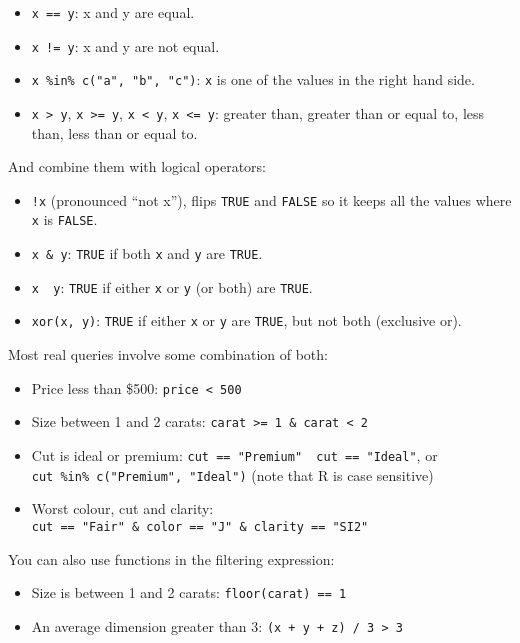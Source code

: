 \begin{itemize}
\tightlist
\item
  \texttt{x\ ==\ y}: x and y are equal.
\item
  \texttt{x\ !=\ y}: x and y are not equal.
\item
  \texttt{x\ \%in\%\ c("a",\ "b",\ "c")}: \texttt{x} is one of the
  values in the right hand side.
\item
  \texttt{x\ \textgreater{}\ y}, \texttt{x\ \textgreater{}=\ y},
  \texttt{x\ \textless{}\ y}, \texttt{x\ \textless{}=\ y}: greater than,
  greater than or equal to, less than, less than or equal to.
\end{itemize}

And combine them with logical operators:

\begin{itemize}
\tightlist
\item
  \texttt{!x} (pronounced ``not x''), flips \texttt{TRUE} and
  \texttt{FALSE} so it keeps all the values where \texttt{x} is
  \texttt{FALSE}.
\item
  \texttt{x\ \&\ y}: \texttt{TRUE} if both \texttt{x} and \texttt{y} are
  \texttt{TRUE}.
\item
  \texttt{x\ \textbar{}\ y}: \texttt{TRUE} if either \texttt{x} or
  \texttt{y} (or both) are \texttt{TRUE}.
\item
  \texttt{xor(x,\ y)}: \texttt{TRUE} if either \texttt{x} or \texttt{y}
  are \texttt{TRUE}, but not both (exclusive or).
\end{itemize}

Most real queries involve some combination of both:

\begin{itemize}
\tightlist
\item
  Price less than \$500: \texttt{price\ \textless{}\ 500}
\item
  Size between 1 and 2 carats:
  \texttt{carat\ \textgreater{}=\ 1\ \&\ carat\ \textless{}\ 2}
\item
  Cut is ideal or premium:
  \texttt{cut\ ==\ "Premium"\ \textbar{}\ cut\ ==\ "Ideal"}, or
  \texttt{cut\ \%in\%\ c("Premium",\ "Ideal")} (note that R is case
  sensitive)
\item
  Worst colour, cut and clarity:
  \texttt{cut\ ==\ "Fair"\ \&\ color\ ==\ "J"\ \&\ clarity\ ==\ "SI2"}
\end{itemize}

You can also use functions in the filtering expression:

\begin{itemize}
\tightlist
\item
  Size is between 1 and 2 carats: \texttt{floor(carat)\ ==\ 1}
\item
  An average dimension greater than 3:
  \texttt{(x\ +\ y\ +\ z)\ /\ 3\ \textgreater{}\ 3}
\end{itemize}

